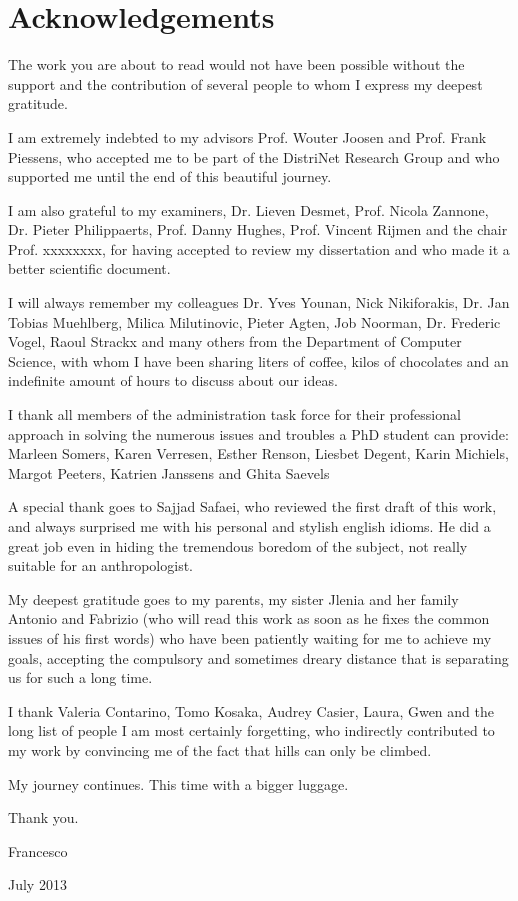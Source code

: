\section*{Acknowledgements}
The work you are about to read would not have been possible without the support and the contribution of several people to whom I express my deepest gratitude.

I am extremely indebted to my advisors Prof. Wouter Joosen and Prof. Frank Piessens, who accepted me to be part of the DistriNet Research Group and who supported me until the end of this beautiful journey.

I am also grateful to my examiners, Dr. Lieven Desmet, Prof. Nicola Zannone, Dr. Pieter Philippaerts, Prof. Danny Hughes, Prof. Vincent Rijmen and the chair Prof. xxxxxxxx, for having accepted to review my dissertation and who made it a better scientific document.

I will always remember my colleagues Dr. Yves Younan, Nick Nikiforakis, Dr. Jan Tobias Muehlberg, Milica Milutinovic, Pieter Agten, Job Noorman, Dr. Frederic Vogel, Raoul Strackx and many others from the Department of Computer Science, with whom I have been sharing liters of coffee, kilos of chocolates and an indefinite amount of hours to discuss about our ideas.

I thank all members of the administration task force for their professional approach in solving the numerous issues and troubles a PhD student can provide: Marleen Somers, Karen Verresen, Esther Renson, Liesbet Degent, Karin Michiels, Margot Peeters, Katrien Janssens and Ghita Saevels

A special thank goes to Sajjad Safaei, who reviewed the first draft of this work, and always surprised me with his personal and stylish english idioms. He did a great job even in hiding the tremendous boredom of the subject, not really suitable for an anthropologist.

My deepest gratitude goes to my parents, my sister Jlenia and her family Antonio and Fabrizio (who will read this work as soon as he fixes the common issues of his first words) who have been patiently waiting for me to achieve my goals, accepting the compulsory and sometimes dreary distance that is separating us for such a long time.

I thank Valeria Contarino, Tomo Kosaka, Audrey Casier, Laura, Gwen and the long list of people I am most certainly forgetting, who indirectly contributed to my work by convincing me of the fact that hills can only be climbed.  

My journey continues. This time with a bigger luggage.

Thank you.

Francesco

July 2013